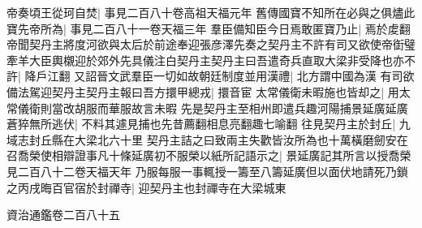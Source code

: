 帝奏頃王從珂自焚|{
	事見二百八十卷高祖天福元年}
舊傳國寶不知所在必與之俱燼此寶先帝所為|{
	事見二百八十一卷天福三年}
羣臣備知臣今日焉敢匿寶乃止|{
	焉於䖍翻}
帝聞契丹主將度河欲與太后於前途奉迎張彦澤先奏之契丹主不許有司又欲使帝衘璧牽羊大臣輿櫬迎於郊外先具儀注白契丹主契丹主曰吾遣奇兵直取大梁非受降也亦不許|{
	降戶江翻}
又詔晉文武羣臣一切如故朝廷制度並用漢禮|{
	北方謂中國為漢}
有司欲備法駕迎契丹主契丹主報曰吾方擐甲總戎|{
	擐音宦}
太常儀衛未暇施也皆却之|{
	用太常儀衛則當改胡服而華服故言未暇}
先是契丹主至相州即遣兵趣河陽捕景延廣延廣蒼猝無所逃伏|{
	不料其遽見捕也先昔薦翻相息亮翻趣七喻翻}
往見契丹主於封丘|{
	九域志封丘縣在大梁北六十里}
契丹主詰之曰致兩主失歡皆汝所為也十萬橫磨劒安在召喬榮使相辯證事凡十條延廣初不服榮以紙所記語示之|{
	景延廣記其所言以授喬榮見二百八十二卷天福天年}
乃服每服一事輒授一籌至八籌延廣但以面伏地請死乃鎖之丙戌晦百官宿於封禪寺|{
	迎契丹主也封禪寺在大梁城東}


資治通鑑卷二百八十五
